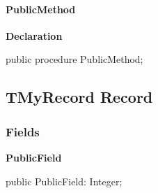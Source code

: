 \documentclass{report}
\newif\ifpdf
\begin{document}
\paragraph*{PublicMethod}\hspace*{\fill}

\label{ok_interface_implicit.IMyInterface-PublicMethod}
\begin{list}{}{
\setlength{\itemindent}{0cm}
\setlength{\listparindent}{0cm}
\setlength{\leftmargin}{\evensidemargin}
\addtolength{\leftmargin}{\tmplength}
\settowidth{\labelsep}{X}
\addtolength{\leftmargin}{\labelsep}
\setlength{\labelwidth}{\tmplength}
}
\item[\textbf{Declaration}\hfill]
\ifpdf
\begin{flushleft}
\fi
\begin{ttfamily}
public procedure PublicMethod;\end{ttfamily}

\ifpdf
\end{flushleft}
\fi

\end{list}
\ifpdf
\subsection*{\large{\textbf{TMyRecord Record}}\normalsize\hspace{1ex}\hrulefill}
\else
\subsection*{TMyRecord Record}
\fi
\label{ok_interface_implicit.TMyRecord}
\subsubsection*{\large{\textbf{Fields}}\normalsize\hspace{1ex}\hfill}
\begin{list}{}{
\setlength{\itemindent}{0cm}
\setlength{\listparindent}{0cm}
\setlength{\leftmargin}{\evensidemargin}
\addtolength{\leftmargin}{\tmplength}
\settowidth{\labelsep}{X}
\addtolength{\leftmargin}{\labelsep}
\setlength{\labelwidth}{\tmplength}
}
\label{ok_interface_implicit.TMyRecord-PublicField}
\item[\textbf{PublicField}\hfill]
\ifpdf
\begin{flushleft}
\fi
\begin{ttfamily}
public PublicField: Integer;\end{ttfamily}

\ifpdf
\end{flushleft}
\fi


\par  \end{list}
\ifpdf
\end{document}
